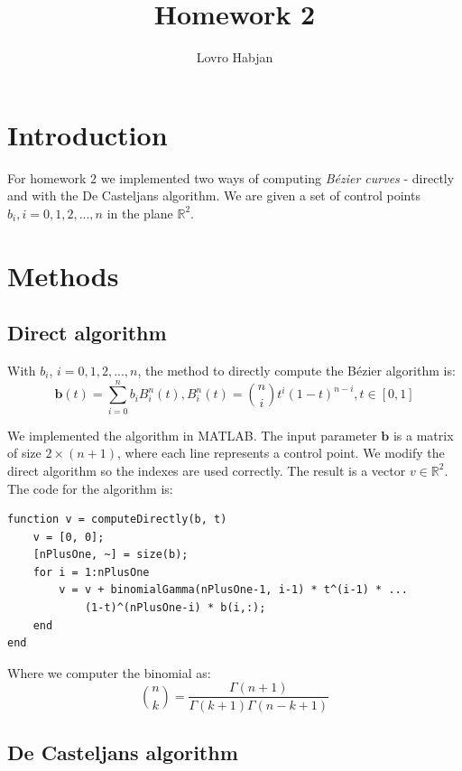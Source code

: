 \documentclass[]{article}
\title{Homework 2}
\author{Lovro Habjan}
\begin{document}
\maketitle

\section{Introduction}

For homework 2 we implemented two ways of computing \textit{B\'ezier curves} -
directly and with the De Casteljans algorithm. We are given a set of control
points $b_i, i = 0, 1, 2, ..., n$ in the plane $\mathbb{R}^2$.

\section{Methods}

\subsection{Direct algorithm}

With $b_i$, $i = 0, 1, 2, ..., n$, the method to directly compute the B\'ezier
algorithm is:
\begin{equation*} \textbf{b}(t) = \sum_{i = 0}^{n} b_i B^n_i (t), B^n_i(t) =
\binom{n}{i} t^i (1-t)^{n-i}, t \in [0, 1]
\end{equation*}

We implemented the algorithm in MATLAB. The input parameter $\textbf{b}$ is a
matrix of size $2 \times (n + 1)$, where each line represents a control
point. We modify the direct algorithm so the indexes are used correctly. The
result is a vector $v \in \mathbb{R}^2$. The code for the algorithm is:
\begin{lstlisting}
function v = computeDirectly(b, t)
    v = [0, 0];
    [nPlusOne, ~] = size(b);
    for i = 1:nPlusOne
        v = v + binomialGamma(nPlusOne-1, i-1) * t^(i-1) * ...
            (1-t)^(nPlusOne-i) * b(i,:);
    end
end
\end{lstlisting}

Where we computer the binomial as:
\begin{equation*}
	\binom{n}{k} = \frac{\Gamma(n+1)}{\Gamma(k+1) \Gamma(n-k+1)}
\end{equation*}

\subsection{De Casteljans algorithm}
\end{document}
